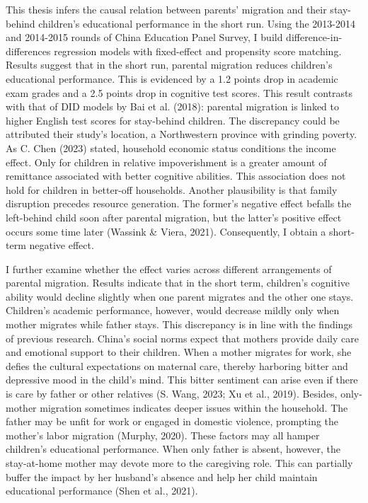 \documentclass[
  man]{apa7}
\begin{document}
This thesis infers the causal relation between parents' migration and their stay-behind children's educational performance in the short run. Using the 2013-2014 and 2014-2015 rounds of China Education Panel Survey, I build difference-in-differences regression models with fixed-effect and propensity score matching. Results suggest that in the short run, parental migration reduces children's educational performance. This is evidenced by a 1.2 points drop in academic exam grades and a 2.5 points drop in cognitive test scores. This result contrasts with that of DID models by Bai et al. (2018): parental migration is linked to higher English test scores for stay-behind children. The discrepancy could be attributed their study's location, a Northwestern province with grinding poverty. As C. Chen (2023) stated, household economic status conditions the income effect. Only for children in relative impoverishment is a greater amount of remittance associated with better cognitive abilities. This association does not hold for children in better-off households. Another plausibility is that family disruption precedes resource generation. The former's negative effect befalls the left-behind child soon after parental migration, but the latter's positive effect occurs some time later (Wassink \& Viera, 2021). Consequently, I obtain a short-term negative effect.

I further examine whether the effect varies across different arrangements of parental migration. Results indicate that in the short term, children's cognitive ability would decline slightly when one parent migrates and the other one stays. Children's academic performance, however, would decrease mildly only when mother migrates while father stays. This discrepancy is in line with the findings of previous research. China's social norms expect that mothers provide daily care and emotional support to their children. When a mother migrates for work, she defies the cultural expectations on maternal care, thereby harboring bitter and depressive mood in the child's mind. This bitter sentiment can arise even if there is care by father or other relatives (S. Wang, 2023; Xu et al., 2019). Besides, only-mother migration sometimes indicates deeper issues within the household. The father may be unfit for work or engaged in domestic violence, prompting the mother's labor migration (Murphy, 2020). These factors may all hamper children's educational performance. When only father is absent, however, the stay-at-home mother may devote more to the caregiving role. This can partially buffer the impact by her husband's absence and help her child maintain educational performance (Shen et al., 2021).
\end{document}
